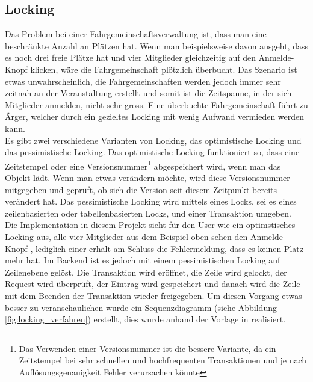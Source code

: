 \subsection{Locking}
Das Problem bei einer Fahrgemeinschaftsverwaltung ist, dass man eine beschränkte Anzahl an Plätzen hat. Wenn man beispielsweise davon ausgeht, dass es noch drei freie Plätze hat und vier Mitglieder gleichzeitig auf den Anmelde-Knopf klicken, wäre die Fahrgemeinschaft plötzlich überbucht. Das Szenario ist etwas unwahrscheinlich, die Fahrgemeinschaften werden jedoch immer sehr zeitnah an der Veranstaltung erstellt und somit ist die Zeitspanne, in der sich Mitglieder anmelden, nicht sehr gross. Eine überbuchte Fahrgemeinschaft führt zu Ärger, welcher durch ein gezieltes Locking mit wenig Aufwand vermieden werden kann.\\

Es gibt zwei verschiedene Varianten von Locking, das optimistische Locking und das pessimistische Locking. Das optimistische Locking funktioniert so, dass eine Zeitstempel oder eine Versionsnummer\footnote{Das Verwenden einer Versionsnummer ist die bessere Variante, da ein Zeitstempel bei sehr schnellen und hochfrequenten Transaktionen und je nach Auflösungsgenauigkeit Fehler verursachen könnte} abgespeichert wird, wenn man das Objekt lädt. Wenn man etwas verändern möchte, wird diese Versionsnummer mitgegeben und geprüft, ob sich die Version seit diesem Zeitpunkt bereits verändert hat. Das pessimistische Locking wird mittels eines Locks, sei es eines zeilenbasierten oder tabellenbasierten Locks, und einer Transaktion umgeben.\\

Die Implementation in diesem Projekt sieht für den User wie ein optimstisches Locking aus, alle vier Mitglieder aus dem Beispiel oben sehen den Anmelde-Knopf , lediglich einer erhält am Schluss die Fehlermeldung, dass es keinen Platz mehr hat. Im Backend ist es jedoch mit einem pessimistischen Locking auf Zeilenebene gelöst. Die Transaktion wird eröffnet, die Zeile wird gelockt, der Request wird überprüft, der Eintrag wird gespeichert und danach wird die Zeile mit dem Beenden der Transaktion wieder freigegeben. Um diesen Vorgang etwas besser zu veranschaulichen wurde ein Sequenzdiagramm (siehe Abbildung \ref{fig:locking_verfahren}) erstellt, dies wurde anhand der Vorlage in \cite{soft_arch_book} realisiert.

